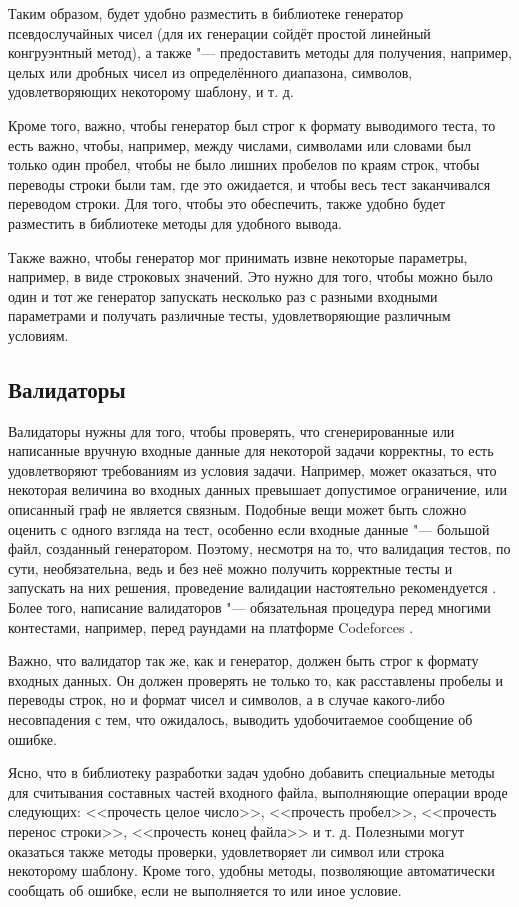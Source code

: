 Таким образом, будет удобно разместить в библиотеке генератор псевдослучайных чисел (для их генерации сойдёт простой линейный конгруэнтный метод), а также "--- предоставить методы для получения, например, целых или дробных чисел из определённого диапазона, символов, удовлетворяющих некоторому шаблону, и т. д.

Кроме того, важно, чтобы генератор был строг к формату выводимого теста, то есть важно, чтобы, например, между числами, символами или словами был только один пробел, чтобы не было лишних пробелов по краям строк, чтобы переводы строки были там, где это ожидается, и чтобы весь тест заканчивался переводом строки. Для того, чтобы это обеспечить, также удобно будет разместить в библиотеке методы для удобного вывода.

Также важно, чтобы генератор мог принимать извне некоторые параметры, например, в виде строковых значений. Это нужно для того, чтобы можно было один и тот же генератор запускать несколько раз с разными входными параметрами и получать различные тесты, удовлетворяющие различным условиям.

\subsection*{Валидаторы}

Валидаторы нужны для того, чтобы проверять, что сгенерированные или написанные вручную входные данные для некоторой задачи корректны, то есть удовлетворяют требованиям из условия задачи. Например, может оказаться, что некоторая величина во входных данных превышает допустимое ограничение, или описанный граф не является связным. Подобные вещи может быть сложно оценить с одного взгляда на тест, особенно если входные данные "--- большой файл, созданный генератором. Поэтому, несмотря на то, что валидация тестов, по сути, необязательна, ведь и без неё можно получить корректные тесты и запускать на них решения, проведение валидации настоятельно рекомендуется \cite{testlib}. Более того, написание валидаторов "--- обязательная процедура перед многими контестами, например, перед раундами на платформе Codeforces \cite{codeforces}.

Важно, что валидатор так же, как и генератор, должен быть строг к формату входных данных. Он должен проверять не только то, как расставлены пробелы и переводы строк, но и формат чисел и символов, а в случае какого-либо несовпадения с тем, что ожидалось, выводить удобочитаемое сообщение об ошибке.

Ясно, что в библиотеку разработки задач удобно добавить специальные методы для считывания составных частей входного файла, выполняющие операции вроде следующих: <<прочесть целое число>>, <<прочесть пробел>>, <<прочесть перенос строки>>, <<прочесть конец файла>> и т. д. Полезными могут оказаться также методы проверки, удовлетворяет ли символ или строка некоторому шаблону. Кроме того, удобны методы, позволяющие автоматически сообщать об ошибке, если не выполняется то или иное условие.

